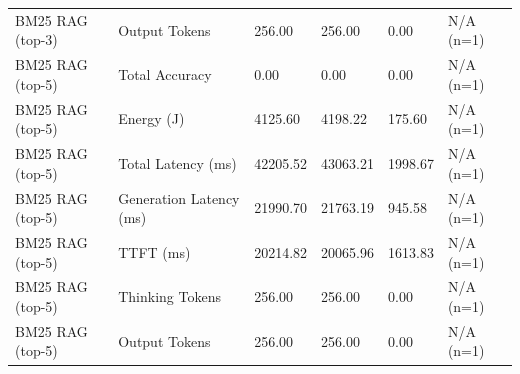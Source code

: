 \begin{table}
\begin{tabular}{llllll}
BM25 RAG (top-3) & Output Tokens & 256.00 & 256.00 & 0.00 & N/A (n=1) \\
BM25 RAG (top-5) & Total Accuracy & 0.00 & 0.00 & 0.00 & N/A (n=1) \\
BM25 RAG (top-5) & Energy (J) & 4125.60 & 4198.22 & 175.60 & N/A (n=1) \\
BM25 RAG (top-5) & Total Latency (ms) & 42205.52 & 43063.21 & 1998.67 & N/A (n=1) \\
BM25 RAG (top-5) & Generation Latency (ms) & 21990.70 & 21763.19 & 945.58 & N/A (n=1) \\
BM25 RAG (top-5) & TTFT (ms) & 20214.82 & 20065.96 & 1613.83 & N/A (n=1) \\
BM25 RAG (top-5) & Thinking Tokens & 256.00 & 256.00 & 0.00 & N/A (n=1) \\
BM25 RAG (top-5) & Output Tokens & 256.00 & 256.00 & 0.00 & N/A (n=1) \\
\bottomrule
\end{tabular}
\end{table}
